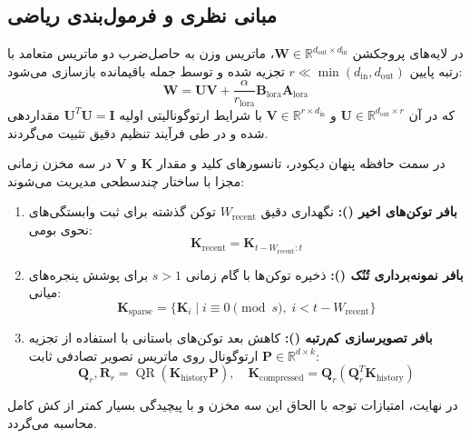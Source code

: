 \subsection{مبانی نظری و فرمول‌بندی ریاضی}
در لایه‌های پروجکشن $\mathbf{W} \in \mathbb{R}^{d_{\text{out}} \times d_{\text{in}}}$، ماتریس وزن به حاصل‌ضرب دو ماتریس متعامد با رتبه پایین $r \ll \min(d_{\text{in}}, d_{\text{out}})$ تجزیه شده و توسط جمله باقیمانده  بازسازی می‌شود:
\begin{equation}
\mathbf{W} = \mathbf{U} \mathbf{V} + \frac{\alpha}{r_{\text{lora}}} \mathbf{B}_{\text{lora}} \mathbf{A}_{\text{lora}}
\end{equation}
که در آن $\mathbf{U} \in \mathbb{R}^{d_{\text{out}} \times r}$ و $\mathbf{V} \in \mathbb{R}^{r \times d_{\text{in}}}$ با شرایط ارتوگونالیتی اولیه $\mathbf{U}^T \mathbf{U} = \mathbf{I}$ مقداردهی شده و در طی فرآیند تنظیم دقیق تثبیت می‌گردند.

در سمت حافظه پنهان دیکودر، تانسورهای کلید و مقدار $\mathbf{K}$ و $\mathbf{V}$ در سه مخزن زمانی مجزا با ساختار چندسطحی مدیریت می‌شوند:
\begin{enumerate}
    \item \textbf{بافر توکن‌های اخیر ():} نگهداری دقیق $W_{\text{recent}}$ توکن گذشته برای ثبت وابستگی‌های نحوی بومی:
    \begin{equation}
    \mathbf{K}_{\text{recent}} = \mathbf{K}_{t - W_{\text{recent}} : t}
    \end{equation}
    \item \textbf{بافر نمونه‌برداری تُنُک ():} ذخیره توکن‌ها با گام زمانی $s > 1$ برای پوشش پنجره‌های میانی:
    \begin{equation}
    \mathbf{K}_{\text{sparse}} = \{ \mathbf{K}_i \mid i \equiv 0 \pmod s, \; i < t - W_{\text{recent}} \}
    \end{equation}
    \item \textbf{بافر تصویرسازی کم‌رتبه ():} کاهش بعد توکن‌های باستانی با استفاده از تجزیه ارتوگونال  روی ماتریس تصویر تصادفی ثابت $\mathbf{P} \in \mathbb{R}^{d \times k}$:
    \begin{equation}
    \mathbf{Q}_r, \mathbf{R}_r = \operatorname{QR}(\mathbf{K}_{\text{history}} \mathbf{P}), \quad \mathbf{K}_{\text{compressed}} = \mathbf{Q}_r \left( \mathbf{Q}_r^T \mathbf{K}_{\text{history}} \right)
    \end{equation}
\end{enumerate}
در نهایت، امتیازات توجه با الحاق این سه مخزن و با پیچیدگی بسیار کمتر از کش کامل محاسبه می‌گردد.

